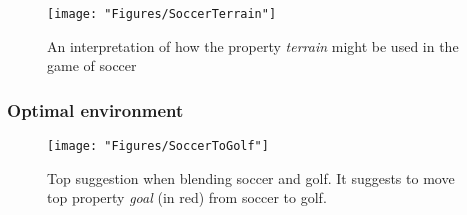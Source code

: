 \begin{figure} \centering \texttt{[image: "Figures/SoccerTerrain"]} \caption[Soccer on terrain]{An interpretation of how the property \emph{terrain} might be used in the game of soccer} \label{fig:SoccerTerrain} \end{figure}


\subsubsection{Optimal environment}
\begin{figure} \centering \texttt{[image: "Figures/SoccerToGolf"]} \caption[Blending soccer and golf]{Top suggestion when blending soccer and golf. It suggests to move top property \emph{goal} (in red) from soccer to golf.} \label{fig:SoccerToGolf} \end{figure}



